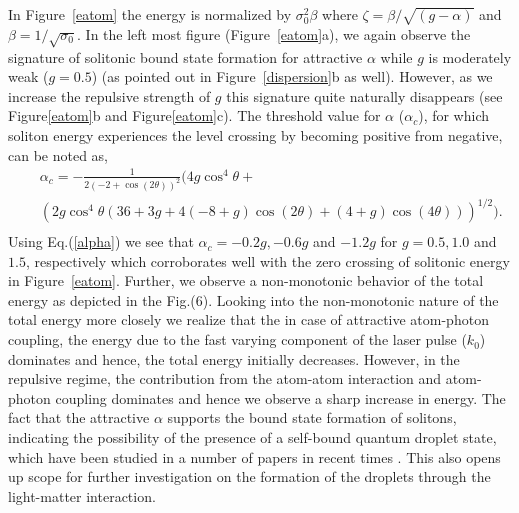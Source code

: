 \documentclass[epj]{svjour}
\begin{document}
In Figure~\ref{eatom} the energy is normalized by $\sigma_0^2\beta$ where $\zeta=\beta/\sqrt{(g-\alpha)}$ and $\beta=1/\sqrt{\sigma_0}$.
In the left most figure (Figure~\ref{eatom}a), we again observe the signature of solitonic bound state formation for attractive $\alpha$ while $g$ is moderately weak ($g=0.5$) (as pointed out in Figure~\ref{dispersion}b as well). However, as we increase the repulsive strength of $g$ this signature quite naturally disappears (see Figure\ref{eatom}b and Figure\ref{eatom}c). The threshold value for $\alpha$ ($\alpha_c$), for which soliton energy experiences the level crossing by becoming positive from negative, can be noted as,
\begin{eqnarray}
&&\alpha_c=-\frac{1}{2 (-2 + \cos(2 \theta))^2} \Big(4 g \cos^{4}\theta + \nonumber\\
&& \left(2 g \cos^{4}\theta (36 + 3 g + 4 (-8 + g) \cos(2 \theta) + (4 + g) \cos(4 \theta))\right)^{1/2}\Big).\nonumber\\
\label{alpha}
\end{eqnarray}
Using Eq.(\ref{alpha}) we see that $\alpha_c=-0.2g, -0.6g$ and $-1.2g$ for $g=0.5, 1.0$ and $1.5$, respectively which corroborates well with the zero crossing of solitonic energy in Figure~\ref{eatom}.
Further, we observe a non-monotonic behavior of the total energy as depicted in the Fig.(6). Looking into the non-monotonic nature of the total energy more closely we realize that the in case of attractive atom-photon coupling, the energy due to the fast varying component of the laser pulse ($k_{0}$) dominates and hence, the total energy initially decreases. However, in the repulsive regime, the contribution from the atom-atom interaction and atom-photon coupling dominates and hence we observe a sharp increase in energy. The fact that the attractive $\alpha$ supports the bound state formation of solitons, indicating the possibility of the presence of a self-bound quantum droplet state, which have been studied in a number of papers in recent times \cite{petrov2015quantum,petrov2016ultra,barbut,debnath2020investigation}. This also opens up scope for further investigation on the formation of the droplets through the light-matter interaction.









\end{document}
